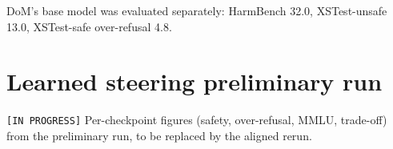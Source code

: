 \documentclass{article}
\begin{document}
DoM's base model was evaluated separately: HarmBench 32.0, XSTest-unsafe 13.0, XSTest-safe over-refusal 4.8.

\section{Learned steering preliminary run}\label{app:C}

\texttt{[IN PROGRESS]} Per-checkpoint figures (safety, over-refusal, MMLU, trade-off) from the preliminary run, to be replaced by the aligned rerun.
\end{document}
